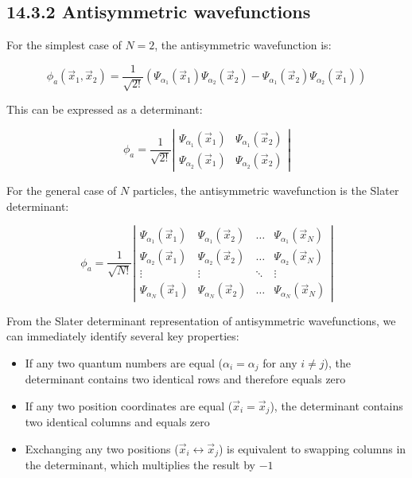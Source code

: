 \documentclass[10pt]{article}
\begin{document}
\subsection*{14.3.2 Antisymmetric wavefunctions}
For the simplest case of $N=2$, the antisymmetric wavefunction is:

\begin{equation*}
\phi_a(\vec{x}_1,\vec{x}_2)=\frac{1}{\sqrt{2!}}(\Psi_{\alpha_1}(\vec{x}_1)\Psi_{\alpha_2}(\vec{x}_2)-\Psi_{\alpha_1}(\vec{x}_2)\Psi_{\alpha_2}(\vec{x}_1)) \tag{14.25}
\end{equation*}

This can be expressed as a determinant:

\[
\phi_a=\frac{1}{\sqrt{2!}}\left|\begin{array}{ll}
\Psi_{\alpha_1}(\vec{x}_1) & \Psi_{\alpha_1}(\vec{x}_2) \tag{14.26}\\
\Psi_{\alpha_2}(\vec{x}_1) & \Psi_{\alpha_2}(\vec{x}_2)
\end{array}\right|
\]

For the general case of $N$ particles, the antisymmetric wavefunction is the Slater determinant:

\[
\phi_a=\frac{1}{\sqrt{N!}}\left|\begin{array}{cccc}
\Psi_{\alpha_1}(\vec{x}_1) & \Psi_{\alpha_1}(\vec{x}_2) & \ldots & \Psi_{\alpha_1}(\vec{x}_N) \tag{14.27}\\
\Psi_{\alpha_2}(\vec{x}_1) & \Psi_{\alpha_2}(\vec{x}_2) & \ldots & \Psi_{\alpha_2}(\vec{x}_N)\\
\vdots & \vdots & \ddots & \vdots\\
\Psi_{\alpha_N}(\vec{x}_1) & \Psi_{\alpha_N}(\vec{x}_2) & \ldots & \Psi_{\alpha_N}(\vec{x}_N)
\end{array}\right|
\]


From the Slater determinant representation of antisymmetric wavefunctions, we can immediately identify several key properties:

\begin{itemize}
  \item If any two quantum numbers are equal ($\alpha_i=\alpha_j$ for any $i\neq j$), the determinant contains two identical rows and therefore equals zero
  \item If any two position coordinates are equal ($\vec{x}_i=\vec{x}_j$), the determinant contains two identical columns and equals zero
  \item Exchanging any two positions ($\vec{x}_i \leftrightarrow \vec{x}_j$) is equivalent to swapping columns in the determinant, which multiplies the result by $-1$
\end{itemize}
\end{document}
